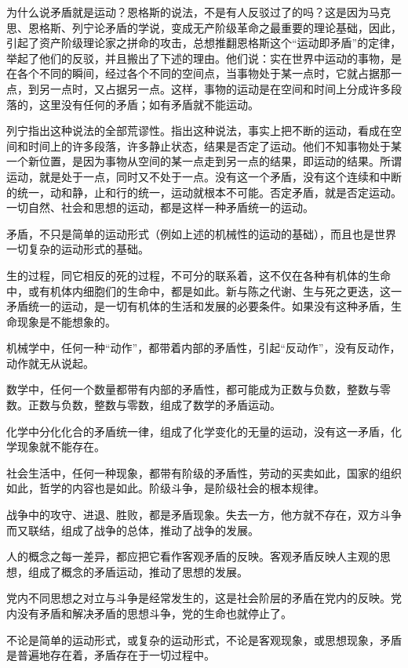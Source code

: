 为什么说矛盾就是运动？恩格斯的说法，不是有人反驳过了的吗？这是因为马克思、恩格斯、列宁论矛盾的学说，变成无产阶级革命之最重要的理论基础，因此，引起了资产阶级理论家之拼命的攻击，总想推翻恩格斯这个“运动即矛盾”的定律，举起了他们的反驳，并且搬出了下述的理由。他们说：实在世界中运动的事物，是在各个不同的瞬间，经过各个不同的空间点，当事物处于某一点时，它就占据那一点，到另一点时，又占据另一点。这样，事物的运动是在空间和时间上分成许多段落的，这里没有任何的矛盾；如有矛盾就不能运动。

列宁指出这种说法的全部荒谬性。指出这种说法，事实上把不断的运动，看成在空间和时间上的许多段落，许多静止状态，结果是否定了运动。他们不知事物处于某一个新位置，是因为事物从空间的某一点走到另一点的结果，即运动的结果。所谓运动，就是处于一点，同时又不处于一点。没有这一个矛盾，没有这个连续和中断的统一，动和静，止和行的统一，运动就根本不可能。否定矛盾，就是否定运动。一切自然、社会和思想的运动，都是这样一种矛盾统一的运动。

矛盾，不只是简单的运动形式（例如上述的机械性的运动的基础），而且也是世界一切复杂的运动形式的基础。

生的过程，同它相反的死的过程，不可分的联系着，这不仅在各种有机体的生命中，或有机体内细胞们的生命中，都是如此。新与陈之代谢、生与死之更迭，这一矛盾统一的运动，是一切有机体的生活和发展的必要条件。如果没有这种矛盾，生命现象是不能想象的。

机械学中，任何一种“动作”，都带着内部的矛盾性，引起“反动作”，没有反动作，动作就无从说起。

数学中，任何一个数量都带有内部的矛盾性，都可能成为正数与负数，整数与零数。正数与负数，整数与零数，组成了数学的矛盾运动。

化学中分化化合的矛盾统一律，组成了化学变化的无量的运动，没有这一矛盾，化学现象就不能存在。

社会生活中，任何一种现象，都带有阶级的矛盾性，劳动的买卖如此，国家的组织如此，哲学的内容也是如此。阶级斗争，是阶级社会的根本规律。

战争中的攻守、进退、胜败，都是矛盾现象。失去一方，他方就不存在，双方斗争而又联结，组成了战争的总体，推动了战争的发展。

人的概念之每一差异，都应把它看作客观矛盾的反映。客观矛盾反映人主观的思想，组成了概念的矛盾运动，推动了思想的发展。

党内不同思想之对立与斗争是经常发生的，这是社会阶层的矛盾在党内的反映。党内没有矛盾和解决矛盾的思想斗争，党的生命也就停止了。

不论是简单的运动形式，或复杂的运动形式，不论是客观现象，或思想现象，矛盾是普遍地存在着，矛盾存在于一切过程中。

